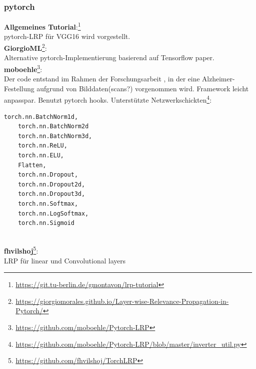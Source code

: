 \documentclass[twoside, 11pt,a4paper]{article}
\numberwithin{equation}{section}
\begin{document}
	\subsubsection{pytorch}
	
	\textbf{Allgemeines Tutorial}:\footnote{\url{https://git.tu-berlin.de/gmontavon/lrp-tutorial}}\\ pytorch-LRP für VGG16 wird vorgestellt.\\
	
	
	\noindent \textbf{GiorgioML}\footnote{\url{https://giorgiomorales.github.io/Layer-wise-Relevance-Propagation-in-Pytorch/}}:\\
	Alternative pytorch-Implementierung basierend auf Tensorflow paper.\\
	
	\noindent \textbf{moboehle}\footnote{\url{https://github.com/moboehle/Pytorch-LRP}}:\\
	Der code entstand im Rahmen der Forschungsarbeit \cite{lrp_alzheimer}, in der eine Alzheimer-Festellung aufgrund von Bilddaten(scans?) vorgenommen wird. Framework leicht anpasspar. Benutzt pytorch hooks. 
	\noindent Unterstützte Netzwerkschickten\footnote{\url{https://github.com/moboehle/Pytorch-LRP/blob/master/inverter_util.py}}:\\

	\begin{lstlisting}[language=Python, caption=Verfügbare Schichten und Aktivierungsfunktionen]
	torch.nn.BatchNorm1d, 
	torch.nn.BatchNorm2d
	torch.nn.BatchNorm3d,
	torch.nn.ReLU, 
	torch.nn.ELU, 
	Flatten,
	torch.nn.Dropout,
	torch.nn.Dropout2d,
	torch.nn.Dropout3d,
	torch.nn.Softmax,
	torch.nn.LogSoftmax,
	torch.nn.Sigmoid
	
	\end{lstlisting}
	\noindent \textbf{fhvilshoj}\footnote{\url{https://github.com/fhvilshoj/TorchLRP}}:\\
	
	
	
	\noindent LRP für linear und Convolutional layers
	
\end{document}
